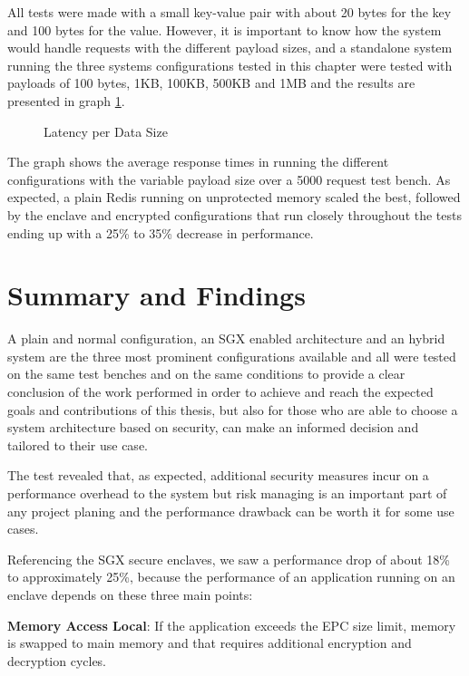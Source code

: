 All tests were made with a small key-value pair with about 20 bytes for the key and 100 bytes for the value. However, it is important to know how the system would handle requests with the different payload sizes, and a standalone system running the three systems configurations tested in this chapter were tested with payloads of 100 bytes, 1KB, 100KB, 500KB and 1MB and the results are presented in graph \ref{fig:latency_per_data_size}.

\begin{figure}[htbp]
  \caption{Latency per Data Size}
  \label{fig:latency_per_data_size}
\end{figure}

The graph shows the average response times in running the different configurations with the variable payload size over a 5000 request test bench. As expected, a plain Redis running on unprotected memory scaled the best, followed by the enclave and encrypted configurations that run closely throughout the tests ending up with a 25\% to 35\% decrease in performance.

\section{ Summary and Findings}
\label{sec:summary_and_findings}

A plain and normal configuration, an \gls{SGX} enabled architecture and an hybrid system are the three most prominent configurations available and all were tested on the same test benches and on the same conditions to provide a clear conclusion of the work performed in order to achieve and reach the expected goals and contributions of this thesis, but also for those who are able to choose a system architecture based on security, can make an informed decision and tailored to their use case.

The test revealed that, as expected, additional security measures incur on a performance overhead to the system but risk managing is an important part of any project planing and the performance drawback can be worth it for some use cases.

Referencing the \gls{SGX} secure enclaves, we saw a performance drop of about 18\% to approximately 25\%, because the performance of an application running on an enclave depends on these three main points:

\textbf{Memory Access Local}: If the application exceeds the \gls{EPC} size limit, memory is swapped to main memory and that requires additional encryption and decryption cycles.

